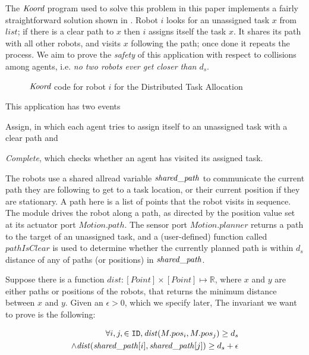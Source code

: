 The $\emph{Koord}$ program used to solve this problem in this paper implements a fairly straightforward solution shown in . Robot $i$ looks for an unassigned task $x$ from $\mathit{list}$; if there is a clear path to $x$ then $i$ assigns itself the task $x$. It shares its path with all other robots, and  visits $x$ following the path; once done it repeats the process.  We aim to prove the \emph{safety} of this application with respect to collisions among agents, i.e. \emph{no two robots ever get closer than $d_s$}.

\begin{figure}[t]
    {
    
    }
    {
    
    }
    \caption{ $\emph{Koord}$ code for robot $i$ for the Distributed Task Allocation}
    \label{fig:taskapp }
\end{figure}


This application has two events \begin{inparaenum} \item {Assign}, in which each agent tries to assign itself to an unassigned task with a clear path  and \item \emph{Complete}, which checks whether an agent has visited its assigned task. \end{inparaenum} The robots use a shared allread variable $\mathit{shared\_path}$ to communicate the current path they are following to get to a task location, or their current position if they are stationary. A path here is a list of points that the robot visits in sequence. The \Motion module drives the robot along a path, as directed by the position value set at its actuator port $\mathit{Motion.path}$. The sensor port $\mathit{Motion.planner}$ returns a path to the target of an unassigned task, and a (user-defined) function called $\mathit{pathIsClear}$ is used to determine whether the currently planned path is within $d_s$ distance of any of paths (or positions) in $\mathit{shared\_path}$.

\newcommand{\dist}{\mathit{dist}}
Suppose there is a function $\dist : [Point] \times [Point] \mapsto \mathbb{R}$, where $x$ and $y$ are either paths or positions of the robots, that returns the minimum distance between $x$ and $y$. Given an $\epsilon > 0$, which we specify later, The invariant we want to prove is the following:
\begin{invariant}
\label{inv:task}
\[\begin{split}
    \forall i,j, \in \UINS, \dist(M.pos_i, M.pos_j) \geq d_s \\ \land \dist(\pathvar[i], \pathvar[j]) \geq d_s + \epsilon
\end{split}
\]
\end{invariant}
\noindent

